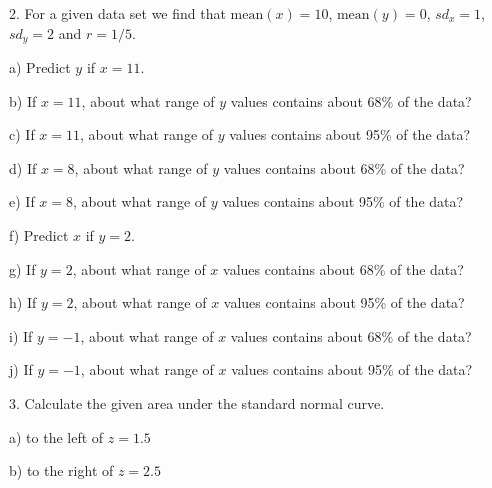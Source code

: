 \documentclass[10pt]{article}
\begin{document}
2.  For a given data set we find that
$\mbox{mean}(x)=10$, $\mbox{mean}(y)=0$, ${sd}_x=1$, ${sd}_y=2$ and  $r=1/5$.

\hspace{10pt} a) Predict $y$ if $x=11$.
\vspace{1.2in}

\hspace{10pt} b)  If $x=11$, about what range of $y$ values contains about 68\% of the data?
\vspace{.5in}

\hspace{10pt} c)  If $x=11$, about what range of $y$ values contains about 95\% of the data?
\vspace{.5in}

\hspace{10pt} d)  If $x=8$, about what range of $y$ values contains about 68\% of the data?
\vspace{.5in}

\hspace{10pt} e)  If $x=8$, about what range of $y$ values contains about 95\% of the data?
\vspace{.5in}


\hspace{10pt} f) Predict $x$ if $y=2$.
\vspace{1.2in}

\hspace{10pt} g)  If $y=2$, about what range of $x$ values contains about 68\% of the data?
\vspace{.5in}

\hspace{10pt} h)  If $y=2$, about what range of $x$ values contains about 95\% of the data?
\vspace{.5in}

\hspace{10pt} i)  If $y=-1$, about what range of $x$ values contains about 68\% of the data?
\vspace{.5in}

\hspace{10pt} j)  If $y=-1$, about what range of $x$ values contains about 95\% of the data?
\vfill
\eject

3. Calculate the given area under the standard normal curve.

\hspace{10pt} a) to the left of $z=1.5$
\vspace{.5in}

\hspace{10pt} b) to the right of $z=2.5$
\vspace{.5in}
\end{document}
